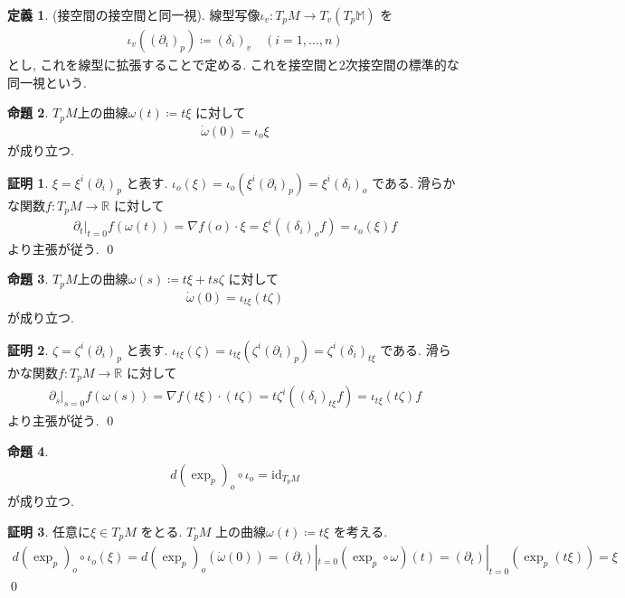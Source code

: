\documentclass[10pt, fleqn, label-section=none]{bxjsarticle}
\theoremstyle{definition}
\newtheorem{dfn}{定義}[section]
\newtheorem{prop}[dfn]{命題}
\newtheorem*{pf*}{証明}
\newcommand{\id}{\textrm{id}}
\renewcommand{\;}{\, ; \,}
\begin{document}
\begin{dfn}(接空間の接空間と同一視). 線型写像$\iota_v :  T_p M \rightarrow T_v(T_p \mathbb M)$ を
\begin{align*} \iota_v ((\partial_i)_p) \coloneqq (\delta_i )_v  \quad (i = 1, \ldots , n)\end{align*}
とし, これを線型に拡張することで定める. これを接空間と2次接空間の標準的な同一視という. 
\end{dfn}

\begin{prop}$T_pM$上の曲線$\omega(t) \coloneqq t\xi$ に対して
\begin{align*} \dot \omega (0) = \iota_o \xi \end{align*}
が成り立つ. 
\end{prop}
\begin{pf*}
$\xi = \xi^i (\partial_i)_p$ と表す. $\iota_o (\xi) = \iota_o (\xi^i (\partial_i)_p) = \xi^i (\delta_i)_o$ である. 滑らかな関数$f: T_pM \rightarrow \mathbb R$ に対して
\begin{align*} \partial_t |_{t = 0} f(\omega (t) ) = \nabla f (o) \cdot \xi = \xi^i ((\delta_i )_o f) = \iota_o (\xi) f  \end{align*}
より主張が従う. 
\qed
\end{pf*}

\begin{prop}$T_pM$上の曲線$\omega(s) \coloneqq t \xi + ts \zeta$ に対して
\begin{align*} \dot \omega (0) = \iota_{t \xi}  (t \zeta) \end{align*}
が成り立つ. 
\end{prop}
\begin{pf*}
$\zeta = \zeta^i (\partial_i)_p$ と表す. $\iota_{t\xi} (\zeta) = \iota_{t\xi} (\zeta^i (\partial_i)_p) = \zeta^i (\delta_i)_{t\xi}$ である. 滑らかな関数$f: T_pM \rightarrow \mathbb R$ に対して
\begin{align*} \partial_s |_{s= 0} f(\omega (s) ) = \nabla f (t\xi) \cdot (t \zeta) = t \zeta^i ((\delta_i )_{t\xi} f) = \iota_{t\xi} (t\zeta) f  \end{align*}
より主張が従う. 
\qed
\end{pf*}


\begin{prop}
\begin{align*} d(\exp_p)_{o} \circ \iota_o = \id_{T_p M} \end{align*}
が成り立つ. 
\end{prop}
\begin{pf*}任意に$\xi \in T_pM$ をとる. 
$T_p M$ 上の曲線$\omega (t) \coloneqq t \xi$ を考える. 
\begin{align*} d(\exp_p)_{o} \circ \iota_o (\xi) =  d(\exp_p)_{o} (\dot \omega (0)) = (\partial_t )|_{t = 0} (\exp_p \circ \omega ) (t) = (\partial_t )|_{t = 0} (\exp _p (t \xi)) = \xi  \end{align*}
\qed
\end{pf*}
\end{document}
